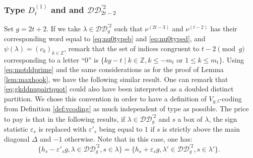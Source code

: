 \documentclass[11pt,letterpaper]{amsart}
\def\bbbz{\mathbb Z}
\def\ccdd{\mathcal {DD}}
\numberwithin{equation}{section}
\numberwithin{df}{section}
\begin{document}
\subsubsection{Type $D^{(1)}_{t}$ and and $\ccdd_{2t-2}^{'2}$}
Set $g=2t+2$.
If we take $\lambda\in\ccdd_{g}^{'2}$ such that $\nu^{(2t-3)}$ and $\nu^{(t-2)}$ has their corresponding word equal to \eqref{eq:nu0typeb} and \eqref{eq:nu0typed}, and $\psi(\lambda)=(c_k)_{k\in\bbbz}$, remark that the set of indices congruent to $t-2\pmod{g}$ corresponding to a letter ``$0$'' is $\lbrace kg-t \mid k\in\bbbz, k\leq -m_t \text{ or } 1\leq k\leq m_t\rbrace$. Using \eqref{eq:motddprime} and the same considerations as for the proof of Lemma \ref{lem:maxhook}, we have the following similar result. One can remark that \eqref{eq:gkddnupairtquot} could also have been interpreted as a doubled distinct partition. We chose this convention in order to have a definition of $V_{g,t}$-coding from Definition \ref{def:vcoding} as much independent of type as possible. The price to pay is that in the following results, if $\lambda\in\ccdd_{g}^{'2}$ and $s$ a box of $\lambda$, the sign statistic $\varepsilon_s$ is replaced with $\varepsilon'_s$ being equal to $1$ if $s$ is strictly above the main diagonal $\Delta$ and $-1$ otherwise. Note that in this case, one has:
$$\lbrace h_s-\varepsilon'_s g,\lambda\in\ccdd_{g}^{'2},s\in\lambda\rbrace=\lbrace h_s+\varepsilon_s g, \lambda'\in\ccdd_{g}^{'2},s\in\lambda'\rbrace.$$
\end{document}
